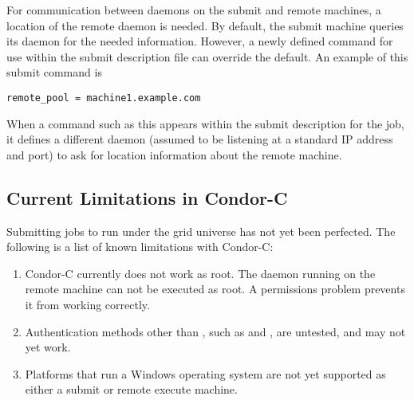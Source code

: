 For communication between  daemons on the submit
and remote machines,
a location of the remote  daemon is needed.
By default, the submit machine queries its 
daemon for the needed information.
However, a newly defined command for use within the submit
description file can override the default.
An example of this submit command is
\footnotesize
\begin{verbatim}
remote_pool = machine1.example.com
\end{verbatim}
\normalsize
When a command such as this appears within the submit description
for the job,
it defines a different  daemon 
(assumed to be listening at a standard IP address and port)
to ask for location information about the remote machine.

\subsection{\label{sec:Condor-C-Limits}Current Limitations in Condor-C}
Submitting jobs to run under the grid universe has not yet
been perfected.
The following is a list of known limitations with Condor-C:

\begin{enumerate}
  \item{Condor-C currently does not work as root.
  The  daemon running on the remote machine can not be
  executed as root.
  A permissions problem prevents it from working correctly.  }

  \item{Authentication methods other than
  , such as  and , are 
  untested, and may not yet work.}

  \item{Platforms that run a Windows operating system
are not yet supported as either a submit or remote execute
machine.}
\end{enumerate}



